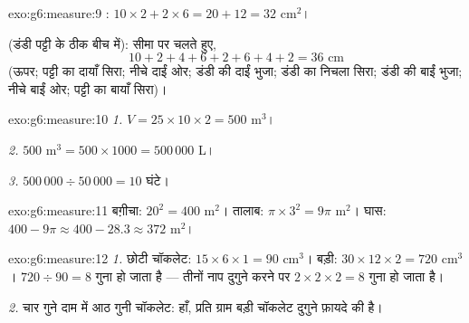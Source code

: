 \begin{solution}{exo:g6:measure:9}
: $10 \times 2 + 2 \times 6 = 20 + 12 = 32$ cm$^2$।

 (डंडी पट्टी के ठीक बीच में): सीमा पर चलते हुए,
\[
10 + 2 + 4 + 6 + 2 + 6 + 4 + 2 = 36 \text{ cm}
\]
(ऊपर; पट्टी का दायाँ सिरा; नीचे दाईं ओर; डंडी की दाईं भुजा;
डंडी का निचला सिरा; डंडी की बाईं भुजा; नीचे बाईं ओर; पट्टी का बायाँ सिरा)।
\end{solution}

\begin{solution}{exo:g6:measure:10}
\emph{1.} $V = 25 \times 10 \times 2 = 500$ m$^3$।

\emph{2.} $500$ m$^3 = 500 \times 1000 = 500\,000$ L।

\emph{3.} $500\,000 \div 50\,000 = 10$ घंटे।
\end{solution}

\begin{solution}{exo:g6:measure:11}
बग़ीचा: $20^2 = 400$ m$^2$। तालाब: $\pi \times 3^2 = 9\pi$ m$^2$।
घास: $400 - 9\pi \approx 400 - 28.3 \approx 372$ m$^2$।
\end{solution}

\begin{solution}{exo:g6:measure:12}
\emph{1.} छोटी चॉकलेट: $15 \times 6 \times 1 = 90$ cm$^3$। बड़ी:
$30 \times 12 \times 2 = 720$ cm$^3$। 
$720 \div 90 = 8$ गुना हो जाता है --- तीनों नाप दुगुने करने पर
 $2 \times 2 \times 2 = 8$ गुना हो जाता है।

\emph{2.} चार गुने दाम में आठ गुनी चॉकलेट: हाँ, प्रति ग्राम बड़ी
चॉकलेट दुगुने फ़ायदे की है।
\end{solution}


